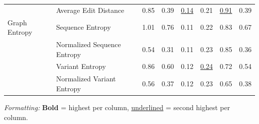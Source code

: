 \begin{table}[H]
\begin{tabular}{llcccccc}
              & Average Edit Distance & 0.85 & 0.39 & \underline{0.14} & 0.21 & \underline{0.91} & 0.39 \\
Graph Entropy & Sequence Entropy & 1.01 & 0.76 & 0.11 & 0.22 & 0.83 & 0.67 \\
              & Normalized Sequence Entropy & 0.54 & 0.31 & 0.11 & 0.23 & 0.85 & 0.36 \\
              & Variant Entropy & 0.86 & 0.60 & 0.12 & \underline{0.24} & 0.72 & 0.54 \\
              & Normalized Variant Entropy & 0.56 & 0.37 & 0.12 & 0.23 & 0.65 & 0.38 \\
\bottomrule
\end{tabular}
\vspace{2pt}
\begin{minipage}{\linewidth}
\centering
\scriptsize
\tiny
\textit{Formatting:} \textbf{Bold} = highest per column, \underline{underlined} = second highest per column.
\end{minipage}
\end{table}

